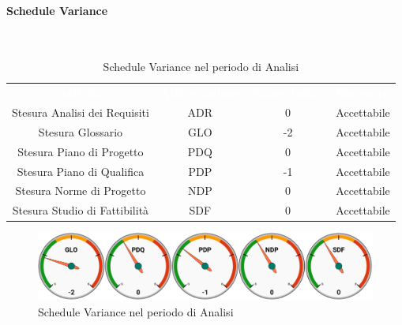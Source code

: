 \paragraph{Schedule Variance}\mbox{}\\[0,3cm]
\begin{table}[H]
    \centering
    \begin{tabular}{cccc}
        \rowcolor{greySWEight}
        \textcolor{white}{\textbf{Attività}} & 
        \textcolor{white}{\textbf{Abbreviazione}} &
        \textcolor{white}{\textbf{Valore Indice}}&
        \textcolor{white}{\textbf{Riscontro}}\\
        Stesura Analisi dei Requisiti & ADR & 0 & \textcolor{YellowOrange}{Accettabile}\\
        Stesura Glossario & GLO & -2 & \textcolor{YellowOrange}{Accettabile}\\
        Stesura Piano di Progetto & PDQ & 0 & \textcolor{YellowOrange}{Accettabile}\\
        Stesura Piano di Qualifica & PDP & -1 & \textcolor{YellowOrange}{Accettabile}\\
        Stesura Norme di Progetto & NDP & 0 & \textcolor{YellowOrange}{Accettabile}\\
        Stesura Studio di Fattibilità & SDF & 0 & \textcolor{YellowOrange}{Accettabile}\\
    \end{tabular}
    \caption{Schedule Variance nel periodo di Analisi}
\end{table}
\begin{figure}[H]
    \centering
	\includegraphics[width=1\linewidth]{sez/App_Esito/graph/AN_SV.pdf}
	\caption{Schedule Variance nel periodo di Analisi}
\end{figure}

